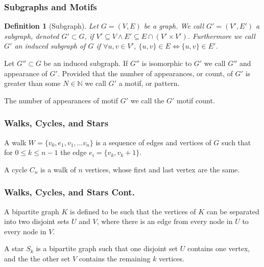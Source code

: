 \documentclass{beamer}
\newtheorem{dfn}{Definition}
\begin{document}
\begin{frame}
    \frametitle{Subgraphs and Motifs}
     
    \begin{dfn}[Subgraph]
        Let $G=(V,E)$ be a graph. We call $G'=(V',E')$ a subgraph, denoted $G' \subset G$, if
        $V' \subseteq V \land E' \subseteq E \cap (V' \times V')$. Furthermore we call $G'$
        an induced subgraph of $G$ if $\forall u,v \in V'$, $\{u,v\}\in E \iff \{u,v\}\in E'$.
    \end{dfn}

     \begin{definition}[Motif]
         Let $G'' \subset G$ be an induced subgraph. If $G''$ is isomorphic to $G'$
         we call $G''$ and appearance of $G'$. Provided that the number of appearances, or count,
         of $G'$ is greater than some $N\in \mathbb{N}$ we call $G'$ a motif, or pattern.
     \end{definition}

     The number of appearances of motif $G'$ we call the $G'$ motif count.
\end{frame}

\begin{frame}
    \frametitle{Walks, Cycles, and Stars}
    \begin{definition}[Walk]
        A walk $W = \{v_0, e_1, v_1, \dots v_n\}$ is a sequence of edges and vertices of $G$ such that
        for $0 \leq k \leq n-1$ the edge $e_i = \{v_k, v_k+1\}$.
    \end{definition}

    \begin{definition}[Cycle]
        A cycle $C_n$ is a walk of $n$ vertices, whose first and last vertex are the same.
    \end{definition}
\end{frame}

\begin{frame}
    \frametitle{Walks, Cycles, and Stars Cont.}
    \begin{definition}
        A bipartite graph $K$ is defined to be such that the vertices of $K$ can be separated into
        two disjoint sets $U$ and $V$, where there is an edge from every node in $U$ to every node in $V$.
    \end{definition}

    \begin{definition}
        A star $S_k$ is a bipartite graph such that one disjoint set $U$ contains one vertex, and the 
        the other set $V$ contains the remaining $k$ vertices.
    \end{definition}
\end{frame}
        
\end{document}
